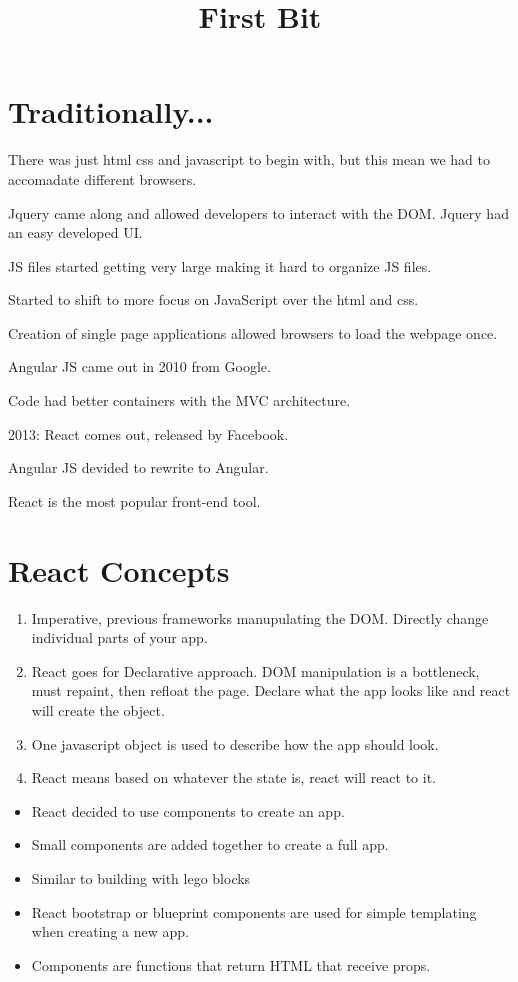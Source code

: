\documentclass[12pt]{article}
\title{First Bit}
\begin{document}
\section{Traditionally...}

There was just html css and javascript to begin with, but this mean we had to
accomadate different browsers.

Jquery came along and allowed developers to interact with the DOM. Jquery had an
easy developed UI.

JS files started getting very large making it hard to organize JS files.

Started to shift to more focus on JavaScript over the html and css.

Creation of single page applications allowed browsers to load the webpage once.

Angular JS came out in 2010 from Google.

Code had better containers with the MVC architecture.

2013: React comes out, released by Facebook.

Angular JS devided to rewrite to Angular.

React is the most popular front-end tool.

\section{React Concepts}
\begin{enumerate}
    \item Imperative, previous frameworks manupulating the DOM. Directly change
        individual parts of your app.

    \item React goes for Declarative approach. DOM manipulation is a bottleneck,
        must repaint, then refloat the page. Declare what the app looks like and
        react will create the object.

    \item One javascript object is used to describe how the app should look.

    \item React means based on whatever the state is, react will react to it.
\end{enumerate}

\begin{itemize}
    \item React decided to use components to create an app.
    \item Small components are added together to create a full app.
    \item Similar to building with lego blocks
    \item React bootstrap or blueprint components are used for simple templating
        when creating a new app.
    \item Components are functions that return HTML that receive props.
\end{itemize}
\end{document}
